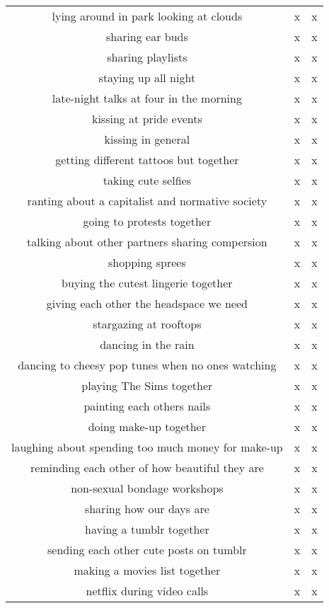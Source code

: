 \documentclass[a4paper]{article}
\begin{document}
\begin{table}[htb]
\begin{tabular}{@{}ccc@{}}
        lying around in park looking at clouds &  x &  x \\
        sharing ear buds &  x &  x \\
        sharing playlists &  x &  x \\
        staying up all night &  x &  x \\
        late-night talks at four in the morning &  x &  x \\
        kissing at pride events &  x &  x \\
        kissing in general &  x &  x \\
        getting different tattoos but together &  x &  x \\
        taking cute selfies &  x &  x \\
        ranting about a capitalist and normative society &  x &  x \\
        going to protests together &  x &  x \\
        talking about other partners sharing compersion &  x &  x \\
        shopping sprees &  x &  x \\
        buying the cutest lingerie together &  x &  x \\
        giving each other the headspace we need &  x &  x \\
        stargazing at rooftops &  x &  x \\
        dancing in the rain &  x &  x \\
        dancing to cheesy pop tunes when no ones watching &  x &  x \\
        playing The Sims together &  x &  x \\
        painting each others nails &  x &  x \\
        doing make-up together &  x &  x \\
        laughing about spending too much money for make-up &  x &  x \\
        reminding each other of how beautiful they are &  x &  x \\
        non-sexual bondage workshops &  x &  x \\
        sharing how our days are &  x &  x \\
        having a tumblr together &  x &  x \\
        sending each other cute posts on tumblr &  x &  x \\
        making a movies list together &  x &  x \\
        netflix during video calls &  x &  x \\

\end{tabular}
\end{table}
\end{document}
